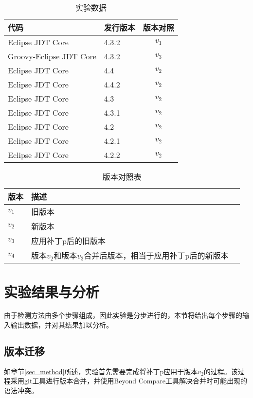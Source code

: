 \begin{table}[H]
	\caption{实验数据}
	\label{exp_data}
	\centering
	\begin{tabular}{llc}
		\toprule[1.5pt]
		{\heiti 代码} & {\heiti 发行版本} & {\heiti 版本对照} \\\midrule[1pt]
		Eclipse JDT Core & 4.3.2 & $v_1$ \\
		Groovy-Eclipse JDT Core & 4.3.2 & $v_3$\\
		Eclipse JDT Core & 4.4 & $v_2$\\
		Eclipse JDT Core & 4.4.2 & $v_2$\\
		Eclipse JDT Core & 4.3 & $v_2$\\
		Eclipse JDT Core & 4.3.1 & $v_2$\\
		Eclipse JDT Core & 4.2 & $v_2$\\
		Eclipse JDT Core & 4.2.1 & $v_2$\\
		Eclipse JDT Core & 4.2.2 & $v_2$\\
		\bottomrule[1.5pt]
	\end{tabular}
\end{table}

\begin{table}
	\caption{版本对照表}
	\label{exp_version}
	\centering
	\begin{tabular}{llc}
		\toprule[1.5pt]
		{\heiti 版本} & {\heiti 描述} \\\midrule[1pt]
		$v_1$ & 旧版本 \\
		$v_2$ & 新版本\\
		$v_3$ & 应用补丁p后的旧版本\\
		$v_4$ & 版本$v_2$和版本$v_3$合并后版本，相当于应用补丁p后的新版本\\
		\bottomrule[1.5pt]
	\end{tabular}
\end{table}

\section{实验结果与分析}
\label {exp_result}

由于检测方法由多个步骤组成，因此实验是分步进行的，本节将给出每个步骤的输入输出数据，并对其结果加以分析。

\subsection{版本迁移}

如章节\ref {sec_method}所述，实验首先需要完成将补丁p应用于版本$v_2$的过程。该过程采用git工具进行版本合并，并使用Beyond Compare工具解决合并时可能出现的语法冲突。

